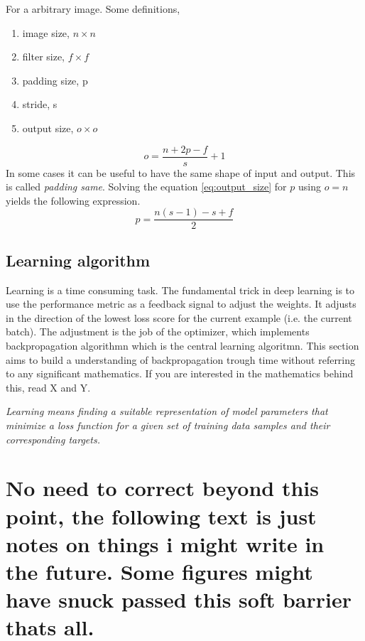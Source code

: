 \documentclass{article}
\begin{document}
For a arbitrary image. Some definitions,
\begin{enumerate}
    \item image size, $n\times n$
    \item filter size, $f\times f$
    \item padding size, p
    \item stride, s
    \item output size, $o \times o$
\end{enumerate}

\begin{equation} \label{eq:output_size}
    o = \frac{n+2p-f}{s} + 1
\end{equation}
In some cases it can be useful to have the same shape of input and output. This is called \textit{padding same}. Solving the equation \eqref{eq:output_size} for $p$ using $o=n$ yields the following expression.
\begin{equation} \label{eq:padding_same}
    p = \frac{n\left(s-1\right)-s+f}{2}
\end{equation}

\subsection{Learning algorithm} \label{sec:backprop_learning_algorithm}
Learning is a time consuming task. The fundamental trick in deep learning is to use the performance metric as a feedback signal to adjust the weights. It adjusts in the direction of the lowest loss score for the current example (i.e. the current batch). The adjustment is the job of the optimizer, which implements backpropagation algorithmn which is the central learning algoritmn. This section aims to build a understanding of backpropagation trough time without referring to any significant mathematics. If you are interested in the mathematics behind this, read X and Y. 

\textit{Learning means finding a suitable representation of model parameters that minimize a loss function for a given set of training data samples and their corresponding targets.}

\section{No need to correct beyond this point, the following text is just notes on things i might write in the future. Some figures might have snuck passed this soft barrier thats all.}
\end{document}

